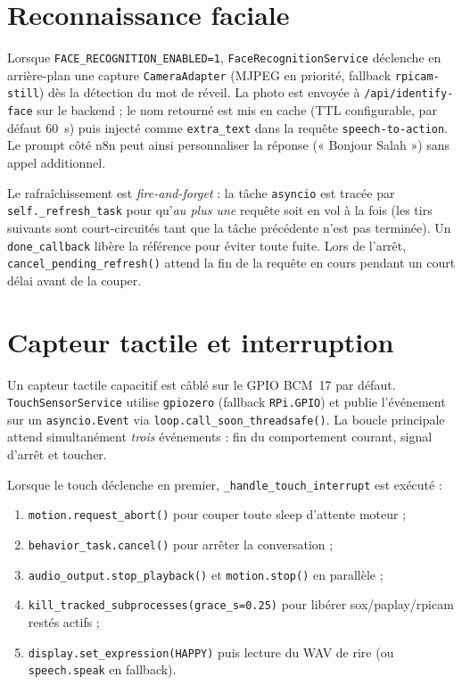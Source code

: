 \documentclass[a4paper,12pt]{report}
\begin{document}
	\section{Reconnaissance faciale}
	
	Lorsque \texttt{FACE\_RECOGNITION\_ENABLED=1},
	\texttt{FaceRecognitionService} déclenche en arrière-plan une capture
	\texttt{CameraAdapter} (MJPEG en priorité, fallback \texttt{rpicam-still})
	dès la détection du mot de réveil. La photo est envoyée à
	\texttt{/api/identify-face} sur le backend ; le nom retourné est mis en
	cache (TTL configurable, par défaut 60~s) puis injecté comme
	\texttt{extra\_text} dans la requête \texttt{speech-to-action}. Le prompt
	côté n8n peut ainsi personnaliser la réponse (« Bonjour Salah ») sans
	appel additionnel.
	
	Le rafraîchissement est \emph{fire-and-forget} : la tâche
	\texttt{asyncio} est tracée par \texttt{self.\_refresh\_task} pour
	qu'\emph{au plus une} requête soit en vol à la fois (les tirs suivants
	sont court-circuités tant que la tâche précédente n'est pas terminée). Un
	\texttt{done\_callback} libère la référence pour éviter toute fuite. Lors
	de l'arrêt, \texttt{cancel\_pending\_refresh()} attend la fin de la
	requête en cours pendant un court délai avant de la couper.
	
	\section{Capteur tactile et interruption}
	
	Un capteur tactile capacitif est câblé sur le GPIO BCM~17 par défaut.
	\texttt{TouchSensorService} utilise \texttt{gpiozero} (fallback
	\texttt{RPi.GPIO}) et publie l'événement sur un
	\texttt{asyncio.Event} via \texttt{loop.call\_soon\_threadsafe()}. La
	boucle principale attend simultanément \emph{trois} événements :
	fin du comportement courant, signal d'arrêt et toucher.
	
	Lorsque le touch déclenche en premier, \texttt{\_handle\_touch\_interrupt}
	est exécuté :
	\begin{enumerate}[noitemsep]
		\item \texttt{motion.request\_abort()} pour couper toute sleep
		d'attente moteur ;
		\item \texttt{behavior\_task.cancel()} pour arrêter la conversation ;
		\item \texttt{audio\_output.stop\_playback()} et \texttt{motion.stop()}
		en parallèle ;
		\item \texttt{kill\_tracked\_subprocesses(grace\_s=0.25)} pour libérer
		sox/paplay/rpicam restés actifs ;
		\item \texttt{display.set\_expression(HAPPY)} puis lecture du WAV de
		rire (ou \texttt{speech.speak} en fallback).
	\end{enumerate}
	
\end{document}
